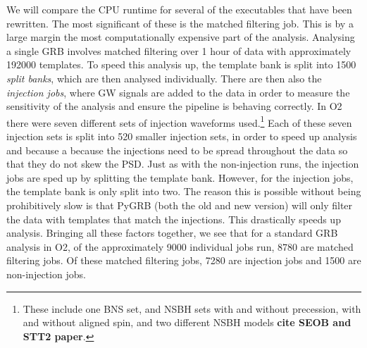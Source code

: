 \documentclass[11pt]{cuthesis}
\begin{document}
We will compare the CPU runtime for several of the executables that have been rewritten. The most significant of these is the matched filtering job. This is by a large margin the most computationally expensive part of the analysis. Analysing a single GRB involves matched filtering over 1 hour of data with approximately 192000 templates. To speed this analysis up, the template bank is split into 1500 \textit{split banks}, which are then analysed individually. There are then also the \textit{injection jobs}, where GW signals are added to the data in order to measure the sensitivity of the analysis and ensure the pipeline is behaving correctly. In O2 there were seven different sets of injection waveforms used.\footnote{These include one BNS set, and NSBH sets with and without precession, with and without aligned spin, and two different NSBH models \textbf{cite SEOB and STT2 paper}.} Each of these seven injection sets is split into 520 smaller injection sets, in order to speed up analysis and because a because the injections need to be spread throughout the data so that they do not skew the PSD. Just as with the non-injection runs, the injection jobs are sped up by splitting the template bank. However, for the injection jobs, the template bank is only split into two. The reason this is possible without being prohibitively slow is that PyGRB (both the old and new version) will only filter the data with templates that match the injections. This drastically speeds up analysis. Bringing all these factors together, we see that for a standard GRB analysis in O2, of the approximately 9000 individual jobs run, 8780 are matched filtering jobs. Of these matched filtering jobs, 7280 are injection jobs and 1500 are non-injection jobs. 
\end{document}
